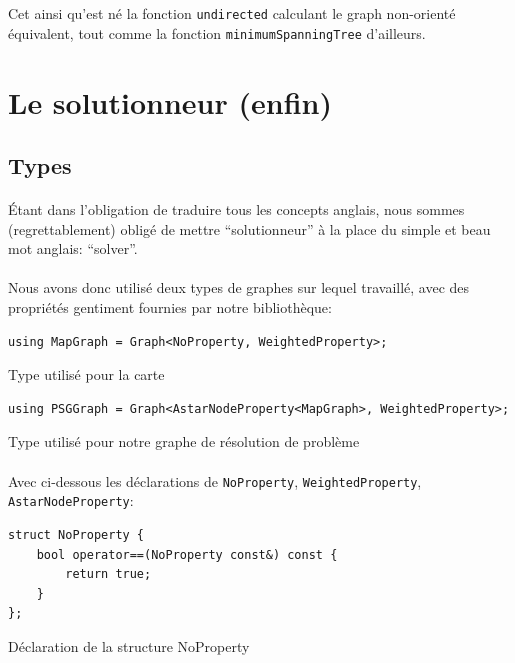 \documentclass[french]{article}
\begin{document}
Cet ainsi qu'est né la fonction \texttt{undirected} calculant le graph
non-orienté équivalent, tout comme la fonction \texttt{minimumSpanningTree}
d'ailleurs.

\section{Le solutionneur (enfin)}

\subsection{Types}

\paragraph{} Étant dans l'obligation de traduire tous les concepts anglais,
nous sommes (regrettablement) obligé de mettre ``solutionneur'' à la place du
simple et beau mot anglais: ``solver''.

\paragraph{} Nous avons donc utilisé deux types de graphes sur lequel
travaillé, avec des propriétés gentiment fournies par notre bibliothèque:

\begin{listing}[H]
\begin{verbatim}
using MapGraph = Graph<NoProperty, WeightedProperty>;
\end{verbatim}
\caption{Type utilisé pour la carte}
\label{tsp:map}
\end{listing}

\begin{listing}[H]
\begin{verbatim}
using PSGGraph = Graph<AstarNodeProperty<MapGraph>, WeightedProperty>;
\end{verbatim}
\caption{Type utilisé pour notre graphe de résolution de problème}
\label{tsp:psg}
\end{listing}

\paragraph{} Avec ci-dessous les déclarations de \texttt{NoProperty},
\texttt{WeightedProperty}, \texttt{AstarNodeProperty}:

\begin{listing}[H]
\begin{verbatim}
struct NoProperty {
	bool operator==(NoProperty const&) const {
		return true;
	}
};
\end{verbatim}
\caption{Déclaration de la structure NoProperty}
\label{tsp:noprop}
\end{listing}
\end{document}
